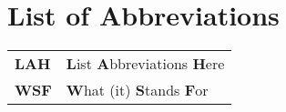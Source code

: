 




\chapter*{List of Abbreviations}

\begin{longtable}{ll}

\textbf{LAH} & \textbf{L}ist \textbf{A}bbreviations \textbf{H}ere\\
	\textbf{WSF} & \textbf{W}hat (it) \textbf{S}tands \textbf{F}or\\
	
\end{longtable}




